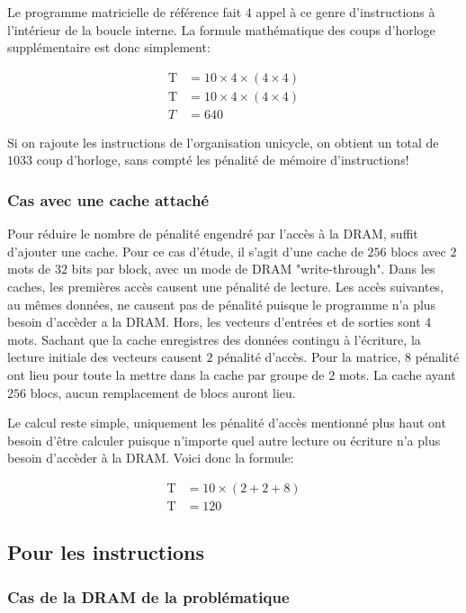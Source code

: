 \documentclass[a11paper]{article}
\begin{document}
Le programme matricielle de référence fait $4$ appel à ce genre
d'instructions à l'intérieur de la boucle interne. La formule mathématique
des coups d'horloge supplémentaire est donc simplement:

\begin{align}
  \text{T} &= 10\times4\times(4\times4) \\
  \text{T} &= 10\times4\times(4\times4) \\
  T        &= 640
\end{align}

Si on rajoute les instructions de l'organisation unicycle, on obtient un
total de $1033$ coup d'horloge, sans compté les pénalité de mémoire
d'instructions!

\subsubsection{Cas avec une cache attaché}

Pour réduire le nombre de pénalité engendré par l'accès à la DRAM, suffit
d'ajouter une cache. Pour ce cas d'étude, il s'agit d'une cache de $256$ blocs
avec $2$ mots de $32$ bits par block, avec un mode de DRAM "write-through".
Dans les caches, les premières accès causent une pénalité de lecture. Les accès
suivantes, au mêmes données, ne causent pas de pénalité puisque le programme n'a
plus besoin d'accèder a la DRAM. Hors, les vecteurs d'entrées et de sorties sont
$4$ mots. Sachant que la cache enregistres des données contingu à l'écriture, la
lecture initiale des vecteurs causent $2$ pénalité d'accès.
Pour la matrice, $8$ pénalité ont lieu pour toute la mettre dans la cache par
groupe de $2$ mots. La cache ayant $256$ blocs, aucun remplacement de blocs
auront lieu.

Le calcul reste simple, uniquement les pénalité d'accès mentionné plus haut
ont besoin d'être calculer puisque n'importe quel autre lecture ou écriture
n'a plus besoin d'accèder à la DRAM. Voici donc la formule:

\begin{align}
  \text{T} &= 10\times(2+2+8) \\
  \text{T} &= 120
\end{align}


\subsection{Pour les instructions}
\subsubsection{Cas de la DRAM de la problématique}
\end{document}
